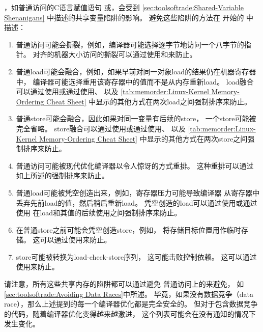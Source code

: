 ，如普通访问的C语言赋值语句
或，会受到
\cref{sec:toolsoftrade:Shared-Variable Shenanigans}
中描述的共享变量陷阱的影响。
避免这些陷阱的方法在
开始的
中描述：

\begin{enumerate}
\item	普通访问可能会撕裂，例如，编译器可能选择逐字节地访问一个八字节的指针。
	对齐的机器大小访问的撕裂可以通过使用和来防止。
\item	普通load可能会融合，例如，如果早前对同一对象load的结果仍在机器寄存器中，
	编译器可能选择重用该寄存器中的值而不是从内存重新load。
	load融合可以通过使用或通过使用、
	以及
	\cref{tab:memorder:Linux-Kernel Memory-Ordering Cheat Sheet}
	中显示的其他方式在两次load之间强制排序来防止。
\item	普通store可能会融合，因此如果对同一变量有后续的store，
	一个store可能被完全省略。
	store融合可以通过使用或通过使用、
	以及
	\cref{tab:memorder:Linux-Kernel Memory-Ordering Cheat Sheet}
	中显示的其他方式在两次store之间强制排序来防止。
\item	普通访问可能被现代优化编译器以令人惊讶的方式重排。
	这种重排可以通过如上所述的强制排序来防止。
\item	普通load可能被凭空创造出来，例如，寄存器压力可能导致编译器
	从寄存器中丢弃先前load的值，然后稍后重新load。
	凭空创造的load可以通过使用或通过使用
	在load和其值的后续使用之间强制排序来防止。
\item	在普通store之前可能会凭空创造store，例如，
	将存储目标位置用作临时存储。
	这可以通过使用来防止。
\item	store可能被转换为load-check-store序列，
	这可能击败控制依赖。
	这可以通过使用来防止。
\end{enumerate}

\QuickQuizEnd

请注意，所有这些共享内存的陷阱都可以通过避免
普通访问上的来避免，
如\cref{sec:toolsoftrade:Avoiding Data Races}中所述。
毕竟，如果没有数据竞争（data race），那么上述提到的每一个编译器优化都是完全安全的。
但对于包含数据竞争的代码，随着编译器优化变得越来越激进，
这个列表可能会在没有通知的情况下发生变化。

